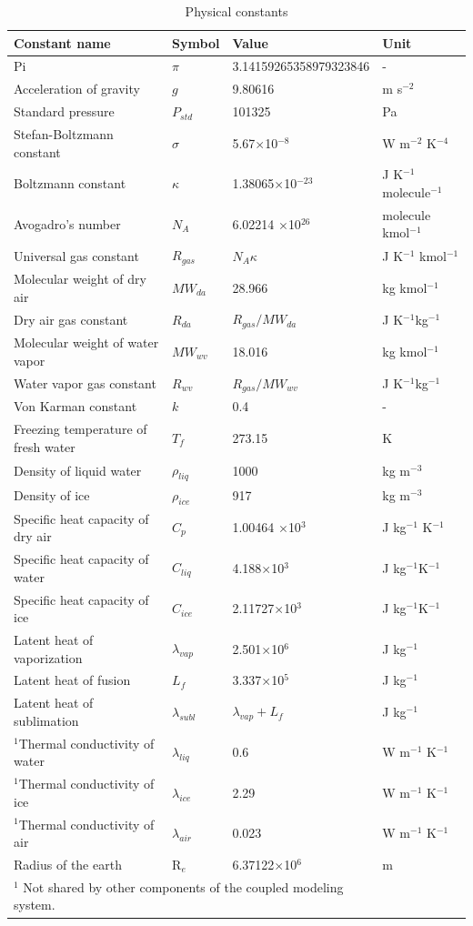 \documentclass[12pt,authoryear]{elsarticle}
\numberwithin{equation}{section} %
\begin{document}
\begin{longtable}{p{6cm} p{2cm} p{3cm} p{2cm}}
\caption{Physical constants}
\label{tab:physical_constants}\\
\toprule
Constant name & Symbol & Value & Unit \\
\midrule
Pi & $\pi$ & 3.14159265358979323846 & - \\
Acceleration of gravity & $g$ & 9.80616 & m s$^{-2}$ \\ 
Standard pressure & $P_{std}$ & 101325 & Pa \\
Stefan-Boltzmann constant & $\sigma$ & 5.67$\times$10$^{-8}$ & W m$^{-2}$ K$^{-4}$ \\
Boltzmann constant & $\kappa$ & 1.38065$\times$10$^{-23}$ & J K$^{-1}$ molecule$^{-1}$ \\
\endfirsthead
\endhead
Avogadro’s number & $N_{A}$ & 6.02214 $\times$10$^{26}$ & molecule kmol$^{-1}$ \\
Universal gas constant & $R_{gas}$ & $N_{A} \kappa$ & J K$^{-1}$ kmol$^{-1}$ \\
Molecular weight of dry air & $M W_{da}$ & 28.966 & kg kmol$^{-1}$ \\
Dry air gas constant & $R_{da}$ & $R_{gas}/MW_{da}$ & J K$^{-1}$kg$^{-1}$\\
Molecular weight of water vapor & $MW_{wv}$ & 18.016 & kg kmol$^{-1}$ \\
Water vapor gas constant & $R_{wv}$ & $R_{gas}/MW_{wv}$ & J K$^{-1}$kg$^{-1}$ \\
Von Karman constant & $k$ & 0.4 & - \\
Freezing temperature of fresh water & $T_{f}$ & 273.15 & K \\
Density of liquid water & $\rho_{liq}$ & 1000 & kg m$^{-3}$ \\
Density of ice & $\rho_{ice}$ & 917 & kg m$^{-3}$ \\
Specific heat capacity of dry air & $C_{p}$ & 1.00464 $\times$10$^{3}$ & J kg$^{-1}$ K$^{-1}$ \\
Specific heat capacity of water & $C_{liq}$ & 4.188$\times$10$^{3}$ & J kg$^{-1}$K$^{-1}$ \\
Specific heat capacity of ice & $C_{ice}$ & 2.11727$\times$10$^{3}$ & J kg$^{-1}$K$^{-1}$ \\
Latent heat of vaporization & $\lambda_{vap}$ & 2.501$\times$10$^{6}$ & J kg$^{-1}$ \\
Latent heat of fusion & $L_{f}$ & 3.337$\times$10$^{5}$ & J kg$^{-1}$ \\
Latent heat of sublimation & $\lambda_{subl}$ & $\lambda_{vap}+L_{f}$ & J kg$^{-1}$ \\
$^{1}$Thermal conductivity of water & $\lambda_{liq}$ & 0.6 & W m$^{-1}$ K$^{-1}$ \\
$^{1}$Thermal conductivity of ice & $\lambda_{ice}$ & 2.29 & W m$^{-1}$ K$^{-1}$ \\
$^{1}$Thermal conductivity of air & $\lambda_{air}$ & 0.023 & W m$^{-1}$ K$^{-1}$ \\
Radius of the earth & R$_{e}$ & 6.37122$\times$10$^{6}$ & m \\
\bottomrule
\multicolumn{3}{p{\textwidth}}{\footnotesize
$^1$ Not shared by other components of the coupled modeling system.
}
\end{longtable}
\end{document}

